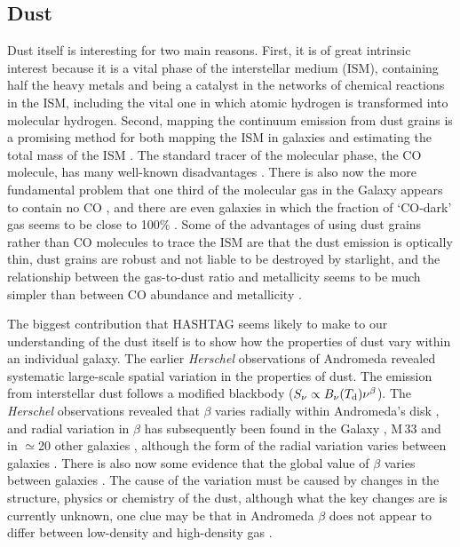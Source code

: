 \documentclass[a4paper,fleqn,usenatbib, twocolumn]{aastex63}
\begin{document}
\subsection{Dust}

Dust itself is interesting for two main reasons. First, it is of great intrinsic
interest because it is a vital phase of the interstellar medium (ISM), containing half the heavy
metals \citep{james2002} and being a catalyst in the networks of chemical reactions in the ISM, including the vital one in which atomic hydrogen is transformed
into molecular hydrogen. Second, mapping the continuum emission from
dust grains is a promising method for both mapping the ISM in galaxies
and estimating the total mass of the ISM \citep{hildebrand1983,eales2012,magdis2012,scoville2014}. The standard
tracer of the molecular phase, the CO molecule,
has many well-known disadvantages \citep{bolatto2013}. There is also now
the more fundamental problem that one third of the molecular gas in the Galaxy appears to contain no
CO \citep{abdo2010,planck2011,pineda2013}, and there are even galaxies
in which the fraction of `CO-dark' gas seems to be close to 100\% \citep{Dunne2021}.
Some of the
advantages of using dust grains rather than CO molecules to trace
the ISM are that the dust emission is optically thin, dust
grains are robust and not liable to be destroyed by starlight, and the relationship
between the gas-to-dust ratio and metallicity seems to be much simpler than between
CO abundance and metallicity \citep{eales2012,sandstrom2013,remyruyer2014}. 
    
The biggest contribution that HASHTAG seems likely to make to our understanding
of the dust itself is to show how the properties of dust vary within an individual
galaxy. The earlier {\it Herschel} observations of Andromeda revealed systematic large-scale spatial variation in the properties of dust. The emission from
interstellar dust follows a modified blackbody ($S_{\nu} \propto B_{\nu}(T_{\rm d}) \nu^{\beta}$). The {\it Herschel} observations revealed
that $\beta$ varies radially within Andromeda's disk \citep{smith2012,draine2014,Whitworth2019}, and radial variation in
$\beta$ has subsequently been found in the Galaxy \citep{planck2014}, M\,33 \citep{tabat2014} and in $\simeq$20 other galaxies \citep{hunt2015}, although
the form of the radial variation varies between galaxies \citep{hunt2015}.
There is also now some
evidence that the global value of $\beta$ varies between
galaxies \citep{lamperti2019}. The cause of the variation must be caused by changes
in the structure, physics or chemistry of the dust, although what the key
changes are is currently unknown, one
clue may be that in Andromeda $\beta$ does not appear to differ between
low-density and high-density gas \citep{Eknath2021}.
\end{document}
